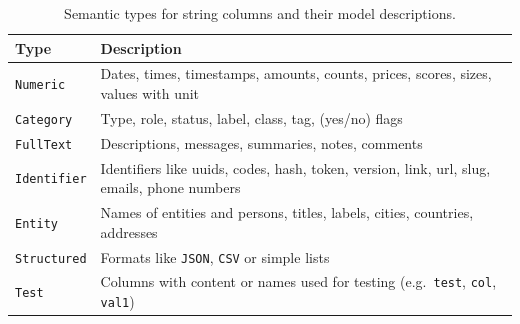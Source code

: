 \begin{table}[h!]
\caption{Semantic types for string columns and their model descriptions.}
\label{tab:semantic-types}
\begin{tabular}{p{}p{}}
\toprule
\textbf{Type} & \textbf{Description} \\
\midrule

\texttt{Numeric} &
Dates, times, timestamps, amounts, counts, prices, scores, sizes, values with unit  \\
\addlinespace[0.3em]

\texttt{Category} &
Type, role, status, label, class, tag, (yes/no) flags  \\
\addlinespace[0.3em]

\texttt{FullText} &
Descriptions, messages, summaries, notes, comments \\
\addlinespace[0.3em]

\texttt{Identifier} &
Identifiers like uuids, codes, hash, token, version, link, url, slug, emails, phone numbers \\
\addlinespace[0.3em]

\texttt{Entity} &
Names of entities and persons, titles, labels, cities, countries, addresses \\
\addlinespace[0.3em]

\texttt{Structured} &
Formats like \texttt{JSON}, \texttt{CSV} or simple lists  \\
\addlinespace[0.3em]

\texttt{Test} &
Columns with content or names used for testing (e.g.\ \texttt{test}, \texttt{col}, \texttt{val1}) \\

\bottomrule
\end{tabular}
\end{table}
